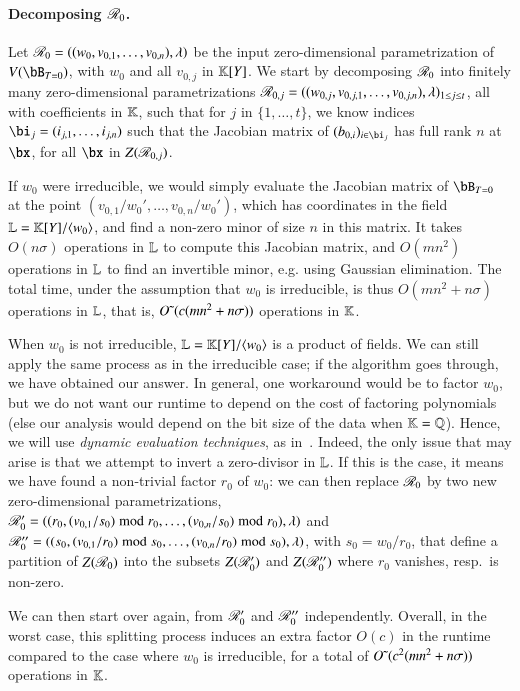 \documentclass[amsthm]{elsart}
\begin{document}
\paragraph*{Decomposing $\mathscr{R}_0$.}
Let $\mathscr{R}_0 =((w_{0},v_{0,1},\dots,v_{0,n}),\lambda)$ be the input
zero-dimensional parametrization of $V(\bB_{T=0})$, with $w_0$ and all
$v_{0,j}$ in $\mathbb{K}[Y]$.  We start by decomposing $\mathscr{R}_0$ into
finitely many zero-dimensional parametrizations
$\mathscr{R}_{0,j}=((w_{0,j},v_{0,j,1},\dots,v_{0,j,n}),\lambda)_{1\le j\le
  t}$, all with coefficients in $\mathbb{K}$, such that for $j$ in
$\{1,\dots,t\}$, we know indices $\bi_j=(i_{j,1},\dots,i_{j,n})$ such that
the Jacobian matrix of $(b_{0,i})_{i \in \bi_j}$ has full rank $n$ at
$\bx$, for all $\bx$ in $Z(\mathscr{R}_{0,j})$.

If $w_0$ were irreducible, we would simply evaluate the Jacobian
matrix of $\bB_{T=0}$ at the point $(v_{0,1}/w_0',\dots,v_{0,n}/w_0')$,
which has coordinates in the field $\mathbb{L}=\mathbb{K}[Y]/\langle w_0 \rangle$,
and find a non-zero minor of size $n$ in this matrix. It takes
$O(n \sigma)$ operations in $\mathbb{L}$ to compute this Jacobian matrix, and
$O(mn^2)$ operations in $\mathbb{L}$ to find an invertible minor, e.g. using
Gaussian elimination. The total time, under the assumption that $w_0$
is irreducible, is thus $O(mn^2 + n\sigma)$ operations in $\mathbb{L}$, that is,
${O}{\,\tilde{ }\,}(c (mn^2 + n\sigma) )$ operations in $\mathbb{K}$.

When $w_0$ is not irreducible, $\mathbb{L}=\mathbb{K}[Y]/\langle w_0 \rangle$ is a
product of fields. We can still apply the same process as in the
irreducible case; if the algorithm goes through, we have obtained our
answer. In general, one workaround would be to factor $w_0$, but we do
not want our runtime to depend on the cost of factoring polynomials
(else our analysis would depend on the bit size of the data when
$\mathbb{K}=\mathbb{Q}$). Hence, we will use {\em dynamic evaluation
  techniques}, as in~\cite{D5}. Indeed, the only issue that may arise
is that we attempt to invert a zero-divisor in $\mathbb{L}$. If this is the case, it
means we have found a non-trivial factor $r_0$ of $w_0$: we can then
replace $\mathscr{R}_0$ by two new zero-dimensional parametrizations,
$\mathscr{R}'_0=((r_0,(v_{0,1}/s_0) \bmod r_0,\dots,(v_{0,n}/s_0)\bmod
r_0),\lambda)$
and
$\mathscr{R}''_0=((s_0,(v_{0,1}/r_0) \bmod s_0,\dots,(v_{0,n}/ r_0)\bmod
s_0),\lambda)$,
with $s_0=w_0/r_0$, that define a partition of $Z(\mathscr{R}_0)$ into the
subsets $Z(\mathscr{R}'_0)$ and $Z(\mathscr{R}''_0)$ where $r_0$ vanishes, resp.\
is non-zero.

We can then start over again, from $\mathscr{R}'_0$ and $\mathscr{R}''_0$
independently. Overall, in the worst case, this splitting process
induces an extra factor $O(c)$ in the runtime compared to the case
where $w_0$ is irreducible, for a total of ${O}{\,\tilde{ }\,}( c^2 (mn^2 + n\sigma) )$
operations in $\mathbb{K}$.
\end{document}
